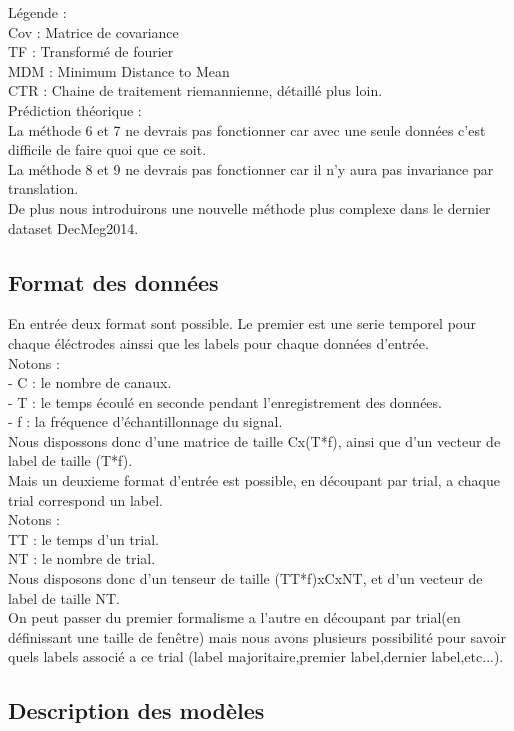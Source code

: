 \documentclass{article}
\begin{document}
Légende :\\
Cov : Matrice de covariance\\
TF : Transformé de fourier\\
MDM : Minimum Distance to Mean\\
CTR : Chaine de traitement riemannienne, détaillé plus loin.
\\
Prédiction théorique : \\
La méthode 6 et 7 ne devrais pas fonctionner car avec une seule données c'est difficile de faire quoi que ce soit.\\
La méthode 8 et 9 ne devrais pas fonctionner car il n'y aura pas invariance par translation.\\
De plus nous introduirons une nouvelle méthode plus complexe dans le dernier dataset DecMeg2014.
\subsection{Format des données}
En entrée deux format sont possible. Le premier est une serie temporel pour chaque éléctrodes ainssi que les labels pour chaque données d'entrée.\\
Notons :\\
- C : le nombre de canaux.\\
- T : le temps écoulé en seconde pendant l'enregistrement des données.\\
- f : la fréquence d’échantillonnage du signal.\\
Nous dispossons donc d'une matrice de taille Cx(T*f), ainsi que d'un vecteur de label de taille (T*f).\\
Mais un deuxieme format d'entrée est possible, en découpant par trial, a chaque trial correspond un label.\\
Notons :\\
TT : le temps d'un trial.\\
NT : le nombre de trial.\\
Nous disposons donc d'un tenseur de taille (TT*f)xCxNT, et d'un vecteur de label de taille NT.\\
On peut passer du premier formalisme a l'autre en découpant par trial(en définissant une taille de fenêtre) mais nous avons plusieurs possibilité pour savoir quels labels associé a ce trial (label majoritaire,premier label,dernier label,etc...).\\
\subsection{Description des modèles}
\end{document}
